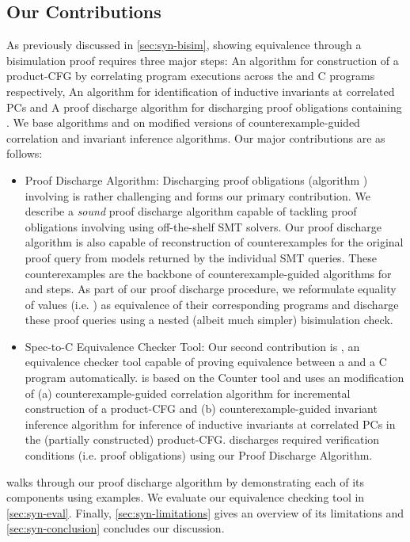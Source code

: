 \subsection{Our Contributions}
\label{sec:syn-contribs}
As previously discussed in \cref{sec:syn-bisim}, showing equivalence through a bisimulation proof
requires three major steps:
 An algorithm for construction of a product-CFG by correlating
program executions across the \SpecL{} and C programs respectively,
 An algorithm for identification of inductive invariants at correlated PCs and
 A proof discharge algorithm for discharging proof obligations containing \recursiveRelations{}.
We base algorithms  and  on modified versions of counterexample-guided correlation
and invariant inference algorithms\cite{oopsla20}. Our major contributions are as follows:

\begin{itemize}
\setlength{\itemsep}{0px}
\item Proof Discharge Algorithm: Discharging proof obligations (algorithm )
involving \recursiveRelations{} is rather challenging and forms our primary contribution.
We describe a {\em sound} proof discharge algorithm capable of tackling proof obligations involving
\recursiveRelations{} using off-the-shelf SMT solvers. Our proof discharge algorithm is also capable of
reconstruction of counterexamples for the original proof query from models returned by the individual SMT queries.
These counterexamples are the backbone of counterexample-guided algorithms for
 and  steps. As part of our proof discharge procedure,
we reformulate equality of values (i.e. \recursiveRelations{}) as equivalence of their corresponding programs
and discharge these proof queries using a nested (albeit much simpler) bisimulation check.

\item Spec-to-C Equivalence Checker Tool: Our second contribution is \toolName{}, an equivalence checker tool
capable of proving equivalence between a \SpecL{} and a C program automatically. \toolName{} is based on
the Counter tool\cite{oopsla20} and uses an modification of (a) counterexample-guided correlation algorithm for
incremental construction of a product-CFG and (b) counterexample-guided invariant inference algorithm
for inference of inductive invariants at correlated PCs in the (partially constructed) product-CFG.
\toolName{} discharges required verification conditions (i.e. proof obligations) using our Proof Discharge Algorithm.
\end{itemize}
\vspace{-5px}
 walks through our proof discharge algorithm by demonstrating each of its
components using examples. We evaluate our equivalence checking tool \toolName{} in \cref{sec:syn-eval}.
Finally, \cref{sec:syn-limitations} gives an overview of its limitations and \cref{sec:syn-conclusion} concludes our discussion.
